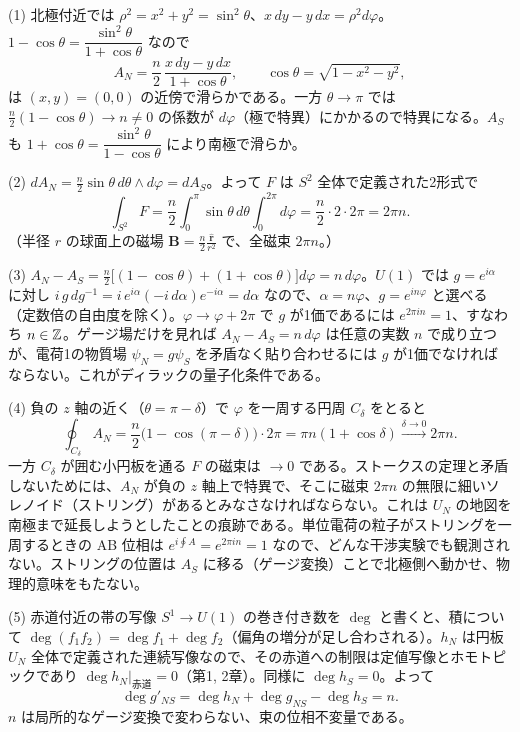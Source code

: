\begin{solution}
(1) 北極付近では $\rho^2=x^2+y^2=\sin^2\theta$、$x\,dy-y\,dx=\rho^2d\varphi$。$1-\cos\theta=\dfrac{\sin^2\theta}{1+\cos\theta}$ なので
\[
A_N=\frac n2\,\frac{x\,dy-y\,dx}{1+\cos\theta},\qquad \cos\theta=\sqrt{1-x^2-y^2},
\]
は $(x,y)=(0,0)$ の近傍で滑らかである。一方 $\theta\to\pi$ では $\frac n2(1-\cos\theta)\to n\neq0$ の係数が $d\varphi$（極で特異）にかかるので特異になる。$A_S$ も $1+\cos\theta=\dfrac{\sin^2\theta}{1-\cos\theta}$ により南極で滑らか。

(2) $dA_N=\frac n2\sin\theta\,d\theta\wedge d\varphi=dA_S$。よって $F$ は $S^2$ 全体で定義された2形式で
\[
\int_{S^2}F=\frac n2\int_0^\pi\sin\theta\,d\theta\int_0^{2\pi}d\varphi=\frac n2\cdot2\cdot2\pi=2\pi n .
\]
（半径 $r$ の球面上の磁場 $\bm B=\frac{n}{2}\frac{\hat{\bm r}}{r^2}$ で、全磁束 $2\pi n$。）

(3) $A_N-A_S=\frac n2\bigl[(1-\cos\theta)+(1+\cos\theta)\bigr]d\varphi=n\,d\varphi$。$U(1)$ では $g=e^{i\alpha}$ に対し $i\,g\,dg^{-1}=i\,e^{i\alpha}(-i\,d\alpha)e^{-i\alpha}=d\alpha$ なので、$\alpha=n\varphi$、$g=e^{in\varphi}$ と選べる（定数倍の自由度を除く）。$\varphi\to\varphi+2\pi$ で $g$ が1価であるには $e^{2\pi in}=1$、すなわち $n\in\mathbb{Z}$。ゲージ場だけを見れば $A_N-A_S=n\,d\varphi$ は任意の実数 $n$ で成り立つが、電荷1の物質場 $\psi_N=g\psi_S$ を矛盾なく貼り合わせるには $g$ が1価でなければならない。これがディラックの量子化条件である。

(4) 負の $z$ 軸の近く（$\theta=\pi-\delta$）で $\varphi$ を一周する円周 $C_\delta$ をとると
\[
\oint_{C_\delta}A_N=\frac n2\bigl(1-\cos(\pi-\delta)\bigr)\cdot2\pi=\pi n(1+\cos\delta)\xrightarrow{\delta\to0}2\pi n .
\]
一方 $C_\delta$ が囲む小円板を通る $F$ の磁束は $\to0$ である。ストークスの定理と矛盾しないためには、$A_N$ が負の $z$ 軸上で特異で、そこに磁束 $2\pi n$ の無限に細いソレノイド（ストリング）があるとみなさなければならない。これは $U_N$ の地図を南極まで延長しようとしたことの痕跡である。単位電荷の粒子がストリングを一周するときの AB 位相は $e^{i\oint A}=e^{2\pi in}=1$ なので、どんな干渉実験でも観測されない。ストリングの位置は $A_S$ に移る（ゲージ変換）ことで北極側へ動かせ、物理的意味をもたない。

(5) 赤道付近の帯の写像 $S^1\to U(1)$ の巻き付き数を $\deg$ と書くと、積について $\deg(f_1f_2)=\deg f_1+\deg f_2$（偏角の増分が足し合わされる）。$h_N$ は円板 $U_N$ 全体で定義された連続写像なので、その赤道への制限は定値写像とホモトピックであり $\deg h_N|_{\text{赤道}}=0$（第1, 2章）。同様に $\deg h_S=0$。よって
\[
\deg g'_{NS}=\deg h_N+\deg g_{NS}-\deg h_S=n .
\]
$n$ は局所的なゲージ変換で変わらない、束の位相不変量である。
\end{solution}

